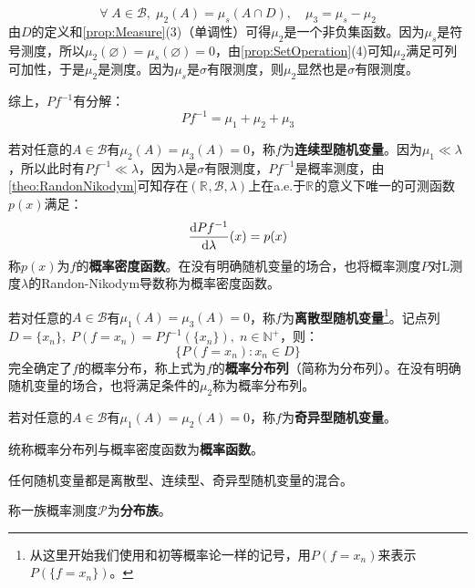\begin{equation*}
	\forall\;A\in\mathcal{B},\;\mu_2(A)=\mu_s(A\cap D),\quad\mu_3=\mu_s-\mu_2
\end{equation*}
由$D$的定义和\cref{prop:Measure}(3)（单调性）可得$\mu_2$是一个非负集函数。因为$\mu_s$是符号测度，所以$\mu_2(\varnothing)=\mu_s(\varnothing)=0$，由\cref{prop:SetOperation}(4)可知$\mu_2$满足可列可加性，于是$\mu_2$是测度。因为$\mu_s$是$\sigma$有限测度，则$\mu_2$显然也是$\sigma$有限测度。\par
综上，$Pf^{-1}$有分解：
\begin{equation*}
	Pf^{-1}=\mu_1+\mu_2+\mu_3
\end{equation*}\par
若对任意的$A\in\mathcal{B}$有$\mu_2(A)=\mu_3(A)=0$，称$f$为\textbf{连续型随机变量}。因为$\mu_1\ll\lambda$，所以此时有$Pf^{-1}\ll\lambda$，因为$\lambda$是$\sigma$有限测度，$Pf^{-1}$是概率测度，由\cref{theo:RandonNikodym}可知存在$(\mathbb{R}^{},\mathcal{B},\lambda)$上在a.e.于$\mathbb{R}^{}$的意义下唯一的可测函数$p(x)$满足：
\begin{equation*}
	\dfrac{\mathop{}\!\mathrm{d} Pf^{-1}}{\mathop{}\!\mathrm{d} \lambda}(x)=p(x)
\end{equation*}
称$p(x)$为$f$的\textbf{概率密度函数}。在没有明确随机变量的场合，也将概率测度$P$对L测度$\lambda$的Randon-Nikodym导数称为概率密度函数。\par
若对任意的$A\in\mathcal{B}$有$\mu_1(A)=\mu_3(A)=0$，称$f$为\textbf{离散型随机变量}\footnote{从这里开始我们使用和初等概率论一样的记号，用$P(f=x_n)$来表示$P(\{f=x_n\})$。}。记点列$D=\{x_n\},\;P(f=x_n)=Pf^{-1}(\{x_n\}),\;n\in\mathbb{N}^+$，则：
\begin{equation*}
	\{P(f=x_n):x_n\in D\}
\end{equation*}
完全确定了$f$的概率分布，称上式为$f$的\textbf{概率分布列}（简称为分布列）。在没有明确随机变量的场合，也将满足条件的$\mu_2$称为概率分布列。\par
若对任意的$A\in\mathcal{B}$有$\mu_1(A)=\mu_2(A)=0$，称$f$为\textbf{奇异型随机变量}。\par
统称概率分布列与概率密度函数为\textbf{概率函数}。\par
\begin{theorem}
	任何随机变量都是离散型、连续型、奇异型随机变量的混合。
\end{theorem}
\begin{definition}
	称一族概率测度$\mathscr{P}$为\textbf{分布族}。
\end{definition}
